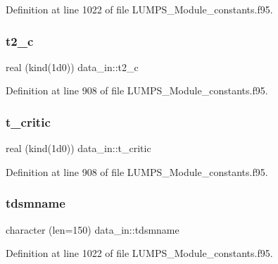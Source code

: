 Definition at line 1022 of file L\+U\+M\+P\+S\+\_\+\+Module\+\_\+constants.\+f95.

\mbox{\label{namespacedata__in_a4bb1b5c9961c3b92df299792352bed5b}} 
\subsubsection{\texorpdfstring{t2\+\_\+c}{t2\_c}}
{\footnotesize\ttfamily real (kind(1d0)) data\+\_\+in\+::t2\+\_\+c}



Definition at line 908 of file L\+U\+M\+P\+S\+\_\+\+Module\+\_\+constants.\+f95.

\mbox{\label{namespacedata__in_aafa124a0fedbdd3fd681dc1de7da58f1}} 
\subsubsection{\texorpdfstring{t\+\_\+critic}{t\_critic}}
{\footnotesize\ttfamily real (kind(1d0)) data\+\_\+in\+::t\+\_\+critic}



Definition at line 908 of file L\+U\+M\+P\+S\+\_\+\+Module\+\_\+constants.\+f95.

\mbox{\label{namespacedata__in_a3c00e15acbb88a04c775598e59d70f87}} 
\subsubsection{\texorpdfstring{tdsmname}{tdsmname}}
{\footnotesize\ttfamily character (len=150) data\+\_\+in\+::tdsmname}



Definition at line 1022 of file L\+U\+M\+P\+S\+\_\+\+Module\+\_\+constants.\+f95.

\mbox{\label{namespacedata__in_aaac1000f5b2d5c88466c307795518d4c}} 
